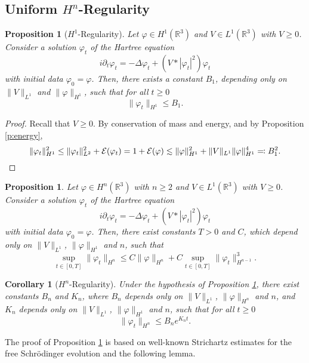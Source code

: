 \documentclass[11pt,a4paper,draft,DIV11]{scrartcl}	%
\newtheorem{cor}[thm]{Corollary}
\newtheorem{prp}[thm]{Proposition}
\newcommand{\R}{\mathds{R}}
\newcommand{\norm}[1]{\lVert#1\rVert}	%
\begin{document}
\subsection{Uniform $H^n$-Regularity}

\begin{prp}[$H^1$-Regularity] \label{p:reg1}
  Let $\varphi \in H^1(\R^3)$ and $V \in L^1(\R^3)$ with $V \ge 0$. Consider a
  solution $\varphi_t$ of the Hartree equation
  \[
    i \partial_t \varphi_t = - \Delta \varphi_t + (V * |\varphi_t|^2)
    \varphi_t
  \]
  with initial data $\varphi_0 = \varphi$. Then, there exists a constant $B_1$, depending only on $\| V \|_{L^1}$ and $\| \varphi
  \|_{H^1}$, such that for all $t \geq 0$
\[
\norm{\varphi_t}_{H^1} \leq B_1. 
\]
\end{prp}
\begin{proof}
 Recall that $V \ge 0$. By conservation of mass and energy,
  and by Proposition \ref{p:energy},
  \[
    \| \varphi_t \|_{H^1}^2 \le \| \varphi_t \|_{L^2}^2 +
    \mathcal{E}(\varphi_t) = 1 + \mathcal{E}(\varphi) \apprle \| \varphi
    \|_{H^1}^2 + \| V \|_{L^1} \| \varphi \|_{H^1}^4 \eqqcolon B_1^2. \qedhere
  \]
\end{proof}

\begin{prp} \label{p:lregn}
  Let $\varphi \in H^n(\R^3)$ with $n \geq 2$ and $V \in L^1(\R^3)$ with $V \ge 0$. Consider a
  solution $\varphi_t$ of the Hartree equation
  \[
    i \partial_t \varphi_t = - \Delta \varphi_t + (V * |\varphi_t|^2)
    \varphi_t
  \]
  with initial data $\varphi_0 = \varphi$. Then, there exist constants $T > 0$
  and $C$, which depend only on $\| V \|_{L^1}$, $\| \varphi \|_{H^1}$ and
  $n$, such that
  \[
    \sup_{t \in [0,T]} \| \varphi_t \|_{H^n} \le C \| \varphi \|_{H^n} + C
    \sup_{t \in [0,T]} \| \varphi_t \|_{H^{n-1}}^3.
  \]
\end{prp}


\begin{cor}[$H^n$-Regularity] \label{c:regn}
  Under the hypothesis of Proposition \ref{p:lregn}, there exist constants
  $B_n$ and $K_n$, where $B_n$ depends only on $\| V \|_{L^1}$, $\| \varphi
  \|_{H^n}$ and $n$, and $K_n$ depends only on $\| V \|_{L^1}$, $\| \varphi
  \|_{H^1}$ and $n$, such that for all $t \ge 0$
  \[
    \| \varphi_t \|_{H^n} \le B_n e^{K_n t}.
  \]
\end{cor}

The proof of Proposition \ref{p:lregn} is based on well-known Strichartz
estimates for the free Schr\"odinger evolution and the following lemma.
\end{document}
